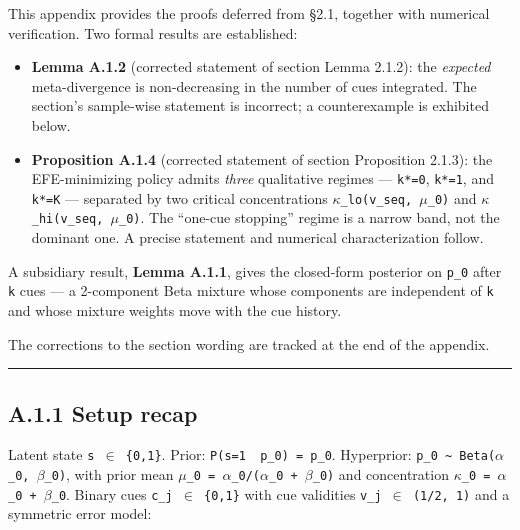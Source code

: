 \documentclass{article}
\providecommand{\tightlist}{\setlength{\itemsep}{0pt}\setlength{\parskip}{0pt}}
\begin{document}
This appendix provides the proofs deferred from \S{}2.1, together with
numerical verification. Two formal results are established:

\begin{itemize}
\tightlist
\item
  \textbf{Lemma A.1.2} (corrected statement of section Lemma 2.1.2): the
  \emph{expected} meta-divergence is non-decreasing in the number of
  cues integrated. The section's sample-wise statement is incorrect; a
  counterexample is exhibited below.
\item
  \textbf{Proposition A.1.4} (corrected statement of section Proposition
  2.1.3): the EFE-minimizing policy admits \emph{three} qualitative
  regimes --- \texttt{k*=0}, \texttt{k*=1}, and \texttt{k*=K} ---
  separated by two critical concentrations \texttt{\ensuremath{\kappa}\_lo(v\_seq,\ \ensuremath{\mu}\_0)}
  and \texttt{\ensuremath{\kappa}\_hi(v\_seq,\ \ensuremath{\mu}\_0)}. The ``one-cue stopping'' regime is
  a narrow band, not the dominant one. A precise statement and numerical
  characterization follow.
\end{itemize}

A subsidiary result, \textbf{Lemma A.1.1}, gives the closed-form
posterior on \texttt{p\_0} after \texttt{k} cues --- a 2-component Beta
mixture whose components are independent of \texttt{k} and whose mixture
weights move with the cue history.

The corrections to the section wording are tracked at the end of the
appendix.

\begin{center}\rule{0.5\linewidth}{0.5pt}\end{center}

\subsection{A.1.1 Setup recap}\label{a.1.1-setup-recap}

Latent state \texttt{s\ \ensuremath{\in}\ \{0,1\}}. Prior:
\texttt{P(s=1\ \textbar{}\ p\_0)\ =\ p\_0}. Hyperprior:
\texttt{p\_0\ \textasciitilde{}\ Beta(\ensuremath{\alpha}\_0,\ \ensuremath{\beta}\_0)}, with prior mean
\texttt{\ensuremath{\mu}\_0\ =\ \ensuremath{\alpha}\_0/(\ensuremath{\alpha}\_0\ +\ \ensuremath{\beta}\_0)} and concentration
\texttt{\ensuremath{\kappa}\_0\ =\ \ensuremath{\alpha}\_0\ +\ \ensuremath{\beta}\_0}. Binary cues \texttt{c\_j\ \ensuremath{\in}\ \{0,1\}}
with cue validities \texttt{v\_j\ \ensuremath{\in}\ (1/2,\ 1)} and a symmetric error
model:
\end{document}
